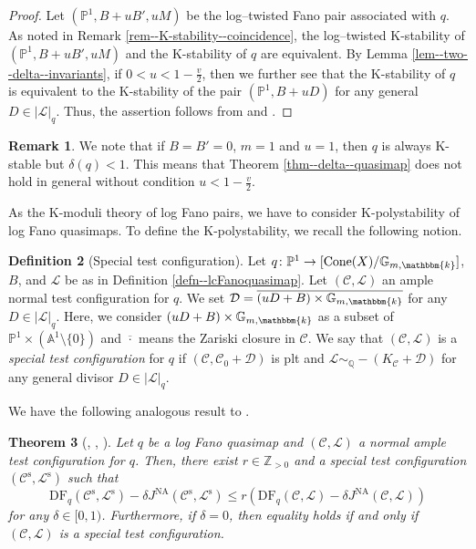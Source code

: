 \documentclass[12pt,twoside]{amsart}
\newtheorem{thm}{Theorem}[section]
\theoremstyle{definition}
\newtheorem{defn}[thm]{Definition}
\newtheorem{rem}[thm]{Remark}
\begin{document}
\begin{proof}
Let $(\mathbb{P}^1,B+uB',uM)$ be the log--twisted Fano pair associated with $q$.
   As noted in Remark \ref{rem--K-stability--coincidence}, the log--twisted K-stability of $(\mathbb{P}^1,B+uB',uM)$ and the K-stability of $q$ are equivalent.
   By Lemma \ref{lem--two--delta--invariants}, if $0<u<1-\frac{v}{2}$, then we further see that the K-stability of $q$ is equivalent to the K-stability of the pair $(\mathbb{P}^1,B+uD)$ for any general $D\in|\mathscr{L}|_q$.
Thus, the assertion follows from \cite[Corollary 9.6]{BHJ} and \cite[Theorem B]{BlJ}.
\end{proof}

\begin{rem}\label{rem--large--u--1}
    We note that if $B=B'=0$, $m=1$ and $u=1$, then $q$ is always K-stable but $\delta(q)<1$. 
    This means that Theorem \ref{thm--delta--quasimap} does not hold in general without condition $u<1-\frac{v}{2}$. 
\end{rem}



As the K-moduli theory of log Fano pairs, we have to consider K-polystability of log Fano quasimaps.
To define the K-polystability, we recall the following notion. 


\begin{defn}[Special test configuration]\label{defn--special-test-config}
    Let $q\colon\mathbb{P}^1 \to [\mathrm{Cone}(X)/\mathbb{G}_{m, \mathbbm{k}}]$, $B$, and $\mathscr{L}$ be as in Definition \ref{defn--lcFanoquasimap}. 
Let $(\mathcal{C},\mathcal{L})$ an ample normal test configuration for $q$.
    We set $\mathcal{D}=\overline{(uD+B)\times\mathbb{G}_{m, \mathbbm{k}}}$ for any  $D\in |\mathscr{L}|_q$. 
    Here, we consider $(uD+B)\times\mathbb{G}_{m, \mathbbm{k}}$ as a subset of $\mathbb{P}^1 \times (\mathbb{A}^1 \setminus \{0\})$ and $\overline{\cdot}$ means the Zariski closure in $\mathcal{C}$.
    We say that $(\mathcal{C},\mathcal{L})$ is a {\it special test configuration} for $q$ if $(\mathcal{C},\mathcal{C}_0+\mathcal{D})$ is plt and $\mathcal{L}\sim_{\mathbb{Q}}-(K_{\mathcal{C}}+\mathcal{D})$ for any general divisor $D\in |\mathscr{L}|_q$.
\end{defn}


We have the following analogous result to \cite[Corollary A.14]{Hat}.

\begin{thm}[{\cite[Corollary 1]{LX}, \cite[Corollary 6.11]{Fjt}, \cite[Theorem 3.12]{BLZ}}]\label{thm--lixu--analog}
    Let $q$ be a log Fano quasimap and $(\mathcal{C},\mathcal{L})$ a normal ample test configuration for $q$.
    Then, there exist $r\in\mathbb{Z}_{>0}$ and a special test configuration $(\mathcal{C}^{\mathrm{s}},\mathcal{L}^{\mathrm{s}})$ such that 
    \[
    \mathrm{DF}_q(\mathcal{C}^{\mathrm{s}},\mathcal{L}^{\mathrm{s}})-\delta J^{\mathrm{NA}}(\mathcal{C}^{\mathrm{s}},\mathcal{L}^{\mathrm{s}})\le r(\mathrm{DF}_q(\mathcal{C},\mathcal{L})-\delta J^{\mathrm{NA}}(\mathcal{C},\mathcal{L}))
    \]
    for any $\delta\in [0,1)$. 
    Furthermore, if $\delta=0$, then equality holds if and only if  $(\mathcal{C},\mathcal{L})$ is a special test configuration.
\end{thm}
\end{document}
